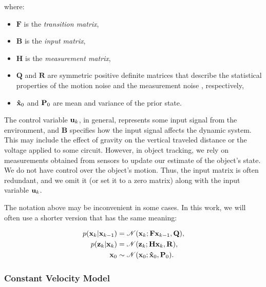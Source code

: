 where:

\begin{itemize}
    \item $\mathbf{F}$ is the \textit{transition matrix},
    \item $\mathbf{B}$ is the \textit{input matrix},
    \item $\mathbf{H}$ is the \textit{measurement matrix},
    \item $\mathbf{Q}$ and $\mathbf{R}$ are symmetric positive definite matrices
        that describe the statistical properties of the motion noise
         and the measurement noise , respectively,
    \item $\vecat{\hat x}{0}$ and $\vecat{P}{0}$ are mean and variance of the 
    prior state.
\end{itemize}

The control variable $\vecat{u}{k}$, in general, represents some input signal from the environment, and $\mathbf{B}$ specifies how the input signal affects the dynamic system. This may include the effect of gravity on the vertical traveled distance or the voltage applied to some circuit. However, in object tracking, we rely on measurements obtained from sensors to update our estimate of the object's state. We do not have control over the object's motion. Thus, the input matrix is often redundant, and we omit it (or set it to a zero matrix) along with the input variable $\vecat{u}{k}$.

The notation above may be inconvenient in some cases. In this work, we will often use a shorter version that has the same meaning:

\begin{align}
    p(\vecat{x}{k} | \vecat{x}{k-1})
        &= \mathscr{N}(\vecat{x}{k}; \mathbf{F}\vecat{x}{k-1}, \mathbf{Q}), 
        \label{eq:motion-model} \\
    p(\vecat{z}{k} | \vecat{x}{k})
        &= \mathscr{N}(\vecat{z}{k}; \mathbf{H}\vecat{x}{k}, \mathbf{R}), 
        \label{eq:measurement-model} \\
    \vecat{x}{0}
        &\sim \mathscr{N}(\vecat{x}{0}; \vecat{\hat{x}}{0}, \vecat{P}{0}).
        \label{eq:prior-x0}
\end{align}

\subsubsection{Constant Velocity Model}\label{sec:cv-model}

